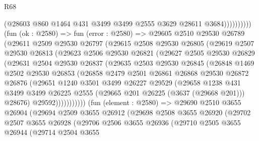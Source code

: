 \begin{lexlean}{R68}
\begin{coremodule}
                          (@28603 @860 @1464 @431 @3499 @3499 @2555 @3629 @28611 @3684))))))))))
        (fun (ok : @2580) =>
        fun (error : @2580) =>
        @29605
          @2510
          @29530
          @26789
          (@29611
            @2509
            @29530
            @26797
            (@29615
              @2508
              @29530
              @26805
              (@29619
                @2507
                @29530
                @26813
                (@29623
                  @2506
                  @29530
                  @26821
                  (@29627
                    @2505
                    @29530
                    @26829
                    (@29631
                      @2504
                      @29530
                      @26837
                      (@29635
                        @2503
                        @29530
                        @26845
                        (@26848
                          @1469
                          @2502
                          @29530
                          @26853
                          (@26858
                            @2479
                            @2501
                            @26861
                            @26868
                            @29530
                            @26872
                            @26876
                            (@29651
                              @1240
                              @3501
                              @3499
                              @26227
                              @29529
                              (@29658
                                @1238
                                @431
                                @3499
                                @3499
                                @26225
                                @2555
                                (@29665 @201 @26225 (@3637 (@29668 @201)))
                                @28676)
                              @29592)))))))))))
        (fun (element : @2580) =>
        @29690
          @2510
          @3655
          @26904
          (@29694
            @2509
            @3655
            @26912
            (@29698
              @2508
              @3655
              @26920
              (@29702
                @2507
                @3655
                @26928
                (@29706
                  @2506
                  @3655
                  @26936
                  (@29710
                    @2505
                    @3655
                    @26944
                    (@29714
                      @2504
                      @3655

\end{coremodule}
\end{lexlean}
